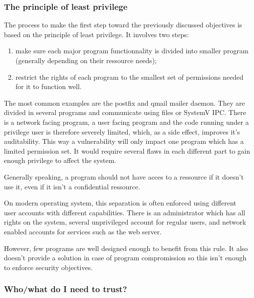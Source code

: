 \documentclass[pdftex,a4paper,titlepage,11pt]{article}
\begin{document}
\subsubsection{The principle of least privilege}

The process to make the first step toward the previously discussed objectives
is based on the principle of least privilege. It involves two steps:
\begin{enumerate}
	\item make sure each major program functionnality is divided into smaller
program (generally depending on their ressource needs);
	\item restrict the rights of each program to the smallest set of
permissions needed for it to function well.
\end{enumerate}

\smallskip

The most common examples are the postfix and qmail mailer daemon. They are
divided in several programs and communicate using files or SystemV IPC. There
is a network facing program, a user facing program and the code running under a
privilege user is therefore severely limited, which, as a side effect, improves
it's auditability. This way a vulnerability will only impact one program which
has a limited permission set. It would require several flaws in each different
part to gain enough privilege to affect the system.

\bigskip

Generally speaking, a program should not have acces to a ressource if it
doesn't use it, even if it isn't a confidential ressource.

\bigskip

On modern operating system, this separation is often enforced using different
user accounts with different capabilities. There is an administrator which has
all rights on the system, several unprivileged account for regular users,
and network enabled accounts for services such as the web server.

\bigskip

However, few programs are well designed enough to benefit from this rule. It
also doesn't provide a solution in case of program compromission so this isn't
enough to enforce security objectives.


\subsubsection{Who/what do I need to trust?}
\end{document}
